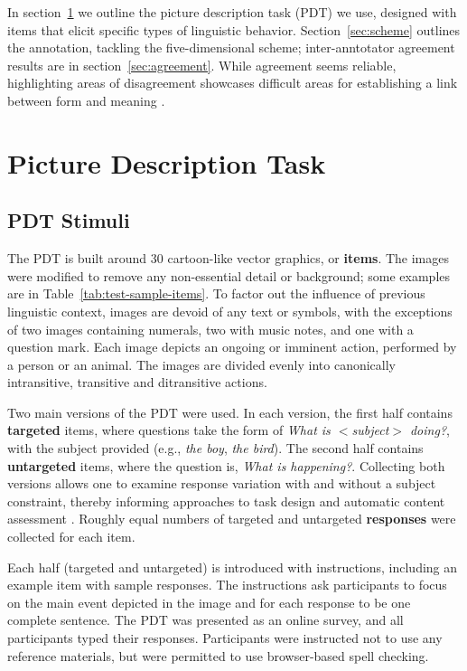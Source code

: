 \documentclass[11pt,a4paper]{article}
\begin{document}
In section~\ref{sec:pdt} we outline the picture description task (PDT) we use, designed with items that elicit specific types of linguistic behavior.  Section~\ref{sec:scheme} outlines the annotation, tackling the five-dimensional scheme; inter-anntotator agreement results are in section~\ref{sec:agreement}.  While agreement seems reliable, highlighting areas of disagreement showcases difficult areas for establishing a link between form and meaning \citep[cf., e.g.,][]{Meurers.Dickinson-17}.

\section{Picture Description Task}
\label{sec:pdt}

\subsection{PDT Stimuli}

The PDT is built around 30 cartoon-like vector graphics, or \textbf{items}. The images were modified to remove any non-essential detail or background; some examples are in Table~\ref{tab:test-sample-items}. To factor out the influence of previous linguistic context, images are devoid of any text or symbols, with the exceptions of two images containing numerals, two with music notes, and one with a question mark. Each image depicts an ongoing or imminent action, performed by a person or an animal. The images are divided evenly into canonically intransitive, transitive and ditransitive actions. 

Two main versions of the PDT were used. In each version, the first half contains \textbf{targeted} items, where questions take the form of \textit{What is $<$subject$>$ doing?}, with the subject provided (e.g., \textit{the boy}, \textit{the bird}). The second half contains \textbf{untargeted} items, where the question is, \textit{What is happening?}. Collecting both versions allows one to examine response variation with and without a subject constraint, thereby informing approaches to task design and automatic content assessment \citep{foster2009native, cho2013investigating}. Roughly equal numbers of targeted and untargeted \textbf{responses} were collected for each item.

Each half (targeted and untargeted) is introduced with instructions, including an example item with sample responses. The instructions ask participants to focus on the main event depicted in the image and for each response to be one complete sentence. The PDT was presented as an online survey, and all participants typed their responses. Participants were instructed not to use any reference materials, but were permitted to use browser-based spell checking.
\end{document}
